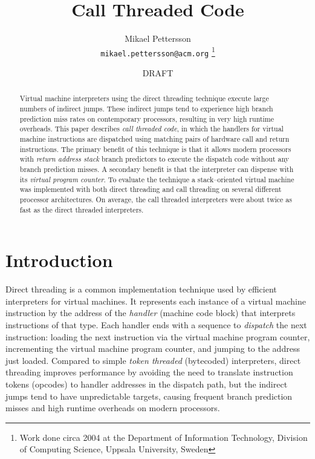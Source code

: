 \documentclass[10pt,a4paper]{article}
\begin{document}
%
\title{Call Threaded Code}
\author{Mikael Pettersson\\
	\texttt{mikael.pettersson@acm.org} \thanks{Work done circa 2004 at the
		Department of Information Technology,
		Division of Computing Science,
		Uppsala University, Sweden}}
\date{	DRAFT}
\maketitle{}
%
\begin{abstract}
Virtual machine interpreters using the direct threading
technique execute large numbers of indirect jumps.
These indirect jumps tend to experience high branch prediction
miss rates on contemporary processors, resulting in very high
runtime overheads.
%
This paper describes \emph{call threaded code}, in which
the handlers for virtual machine instructions are
dispatched using matching pairs of hardware call and
return instructions. The primary benefit of this
technique is that it allows modern processors with
\emph{return address stack} branch predictors to execute
the dispatch code without any branch prediction misses.
A secondary benefit is that the interpreter can dispense
with its \emph{virtual program counter}.
%
To evaluate the technique a stack--oriented virtual machine was
implemented with both direct threading and call threading
on several different processor architectures.
On average, the call threaded interpreters were about twice
as fast as the direct threaded interpreters.
\end{abstract}
%
\section{Introduction}
Direct threading is a common implementation technique
used by efficient interpreters for virtual machines.
It represents each instance of a virtual machine instruction
by the address of the \emph{handler} (machine code block) that
interprets instructions of that type. 
Each handler ends with a sequence to \emph{dispatch}
the next instruction: loading the next instruction via
the virtual machine program counter, incrementing the
virtual machine program counter, and jumping to the address just loaded.
Compared to simple \emph{token threaded} (bytecoded) interpreters,
direct threading improves performance by avoiding the need to
translate instruction tokens (opcodes) to handler addresses
in the dispatch path, but the indirect jumps tend to have
unpredictable targets, causing frequent branch prediction
misses and high runtime overheads on modern processors.
\end{document}
